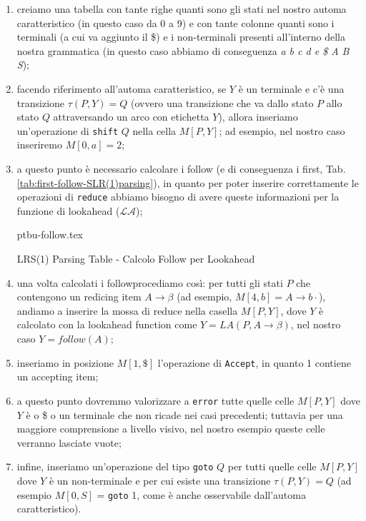 \documentclass[class=book, crop=false, oneside, 12pt]{standalone}
\begin{document}
\begin{enumerate}
    \item creiamo una tabella con tante righe quanti sono gli stati nel nostro automa caratteristico (in questo caso da 0 a 9) e con tante colonne quanti sono i terminali (a cui va aggiunto il \$) e i non-terminali presenti all'interno della nostra grammatica (in questo caso abbiamo di conseguenza \emph{a b c d e \$ A B S});
    \item facendo riferimento all'automa caratteristico, se \(Y\) è un terminale e c'è una transizione \(\tau (P, Y) = Q\) (ovvero una transizione che va dallo stato \(P\) allo stato \(Q\) attraversando un arco con etichetta \(Y\)), allora inseriamo un'operazione di \texttt{shift} \(Q\) nella cella \(M[P, Y]\); ad esempio, nel nostro caso inseriremo \(M[0, a] = 2\);
    \item a questo punto è necessario calcolare i follow (e di conseguenza i first, Tab.\ref{tab:first-follow-SLR(1)parsing}), in quanto per poter inserire correttamente le operazioni di \texttt{reduce} abbiamo bisogno di avere queste informazioni per la funzione di lookahead (\(\mathcal{LA}\));
    \begin{table}[H]
        \centering
        {ptbu-follow.tex}
        \caption{LRS(1) Parsing Table - Calcolo Follow per Lookahead}
        \label{tab:first-follow-SLR(1)parsing}
    \end{table}
    \item una volta calcolati i followprocediamo così: per tutti gli stati \(P\) che contengono un redicing item \(A \to \beta\) (ad esempio, \(M[4, b] = A \rightarrow b\cdot\)), andiamo a inserire la mossa di reduce nella casella \(M[P, Y]\), dove \(Y\) è calcolato con la lookahead function come \(Y = LA(P, A \to \beta)\), nel nostro caso \(Y = follow(A)\); 
    \item inseriamo in posizione \(M[1, \$]\) l'operazione di \texttt{Accept}, in quanto 1 contiene un accepting item;
    \item a questo punto dovremmo valorizzare a \texttt{error} tutte quelle celle \(M[P, Y]\) dove \(Y\) è o \$ o un terminale che non ricade nei casi precedenti; tuttavia per una maggiore comprensione a livello visivo, nel nostro esempio queste celle verranno lasciate vuote;
    \item infine, inseriamo un'operazione del tipo \texttt{goto} \(Q\) per tutti quelle celle \(M[P, Y]\) dove \(Y\) è un non-terminale e per cui esiste una transizione \(\tau(P, Y) = Q\) (ad esempio \(M[0, S]\) = \texttt{goto} 1, come è anche osservabile dall'automa caratteristico).
\end{enumerate}
\end{document}
